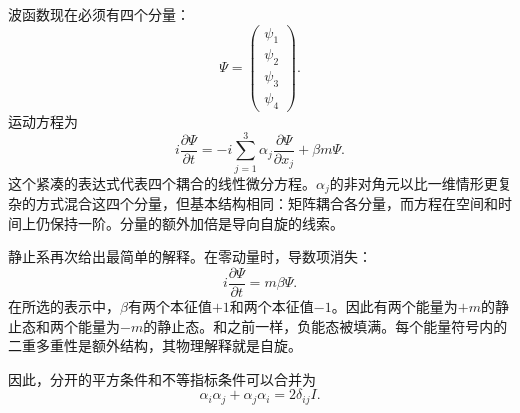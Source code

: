波函数现在必须有四个分量：
\begin{equation}
\Psi=
\begin{pmatrix}
\psi_1\\
\psi_2\\
\psi_3\\
\psi_4
\end{pmatrix}.
\end{equation}
运动方程为
\begin{equation}
i\frac{\partial\Psi}{\partial t}
=
-i\sum_{j=1}^{3}\alpha_j
\frac{\partial\Psi}{\partial x_j}
+\beta m\Psi.
\end{equation}
这个紧凑的表达式代表四个耦合的线性微分方程。\(\alpha_j\)的非对角元以比一维情形更复杂的方式混合这四个分量，但基本结构相同：矩阵耦合各分量，而方程在空间和时间上仍保持一阶。分量的额外加倍是导向自旋的线索。

\begin{classroomqa}
\end{classroomqa}

静止系再次给出最简单的解释。在零动量时，导数项消失：
\begin{equation}
i\frac{\partial\Psi}{\partial t}=m\beta\Psi.
\end{equation}
在所选的表示中，\(\beta\)有两个本征值\(+1\)和两个本征值\(-1\)。因此有两个能量为\(+m\)的静止态和两个能量为\(-m\)的静止态。和之前一样，负能态被填满。每个能量符号内的二重多重性是额外结构，其物理解释就是自旋。

\begin{classroomqa}
\end{classroomqa}

\begin{classroomqa}
\end{classroomqa}

因此，分开的平方条件和不等指标条件可以合并为
\begin{equation}
\alpha_i\alpha_j+\alpha_j\alpha_i=2\delta_{ij}I.
\end{equation}

